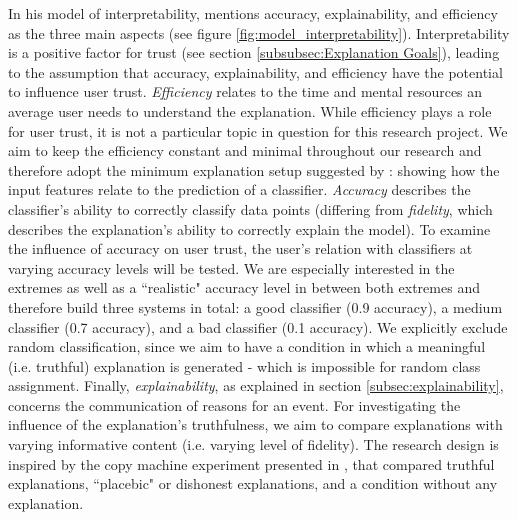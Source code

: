 \noindent In his model of interpretability, \cite{ruping2006learning} mentions accuracy, explainability, and efficiency as the three main aspects (see figure \ref{fig:model_interpretability}). Interpretability is a positive factor for trust (see section \ref{subsubsec:Explanation Goals}), leading to the assumption that accuracy, explainability, and efficiency have the potential to influence user trust. \textit{Efficiency} relates to the time and mental resources an average user needs to understand the explanation. While efficiency plays a role for user trust, it is not a particular topic in question for this research project. We aim to keep the efficiency constant and minimal throughout our research and therefore adopt the minimum explanation setup suggested by \cite{goodman16eu}: showing how the input features relate to the prediction of a classifier. \newline
\textit{Accuracy} describes the classifier's ability to correctly classify data points (differing from \textit{fidelity}, which describes the explanation's ability to correctly explain the model). To examine the influence of accuracy on user trust, the user's relation with classifiers at varying accuracy levels will be tested. We are especially interested in the extremes as well as a ``realistic" accuracy level in between both extremes and therefore build three systems in total: a good classifier (0.9 accuracy), a medium classifier (0.7 accuracy), and a bad classifier (0.1 accuracy). We explicitly exclude random classification, since we aim to have a condition in which a meaningful (i.e. truthful) explanation is generated - which is impossible for random class assignment.\newline
Finally, \textit{explainability}, as explained in section \ref{subsec:explainability}, concerns the communication of reasons for an event. For investigating the influence of the explanation's truthfulness, we aim to compare explanations with varying informative content (i.e. varying level of fidelity). The research design is inspired by the copy machine experiment presented in \cite{langer1978mindlessness}, that compared truthful explanations, ``placebic" or dishonest explanations, and a condition without any explanation.



